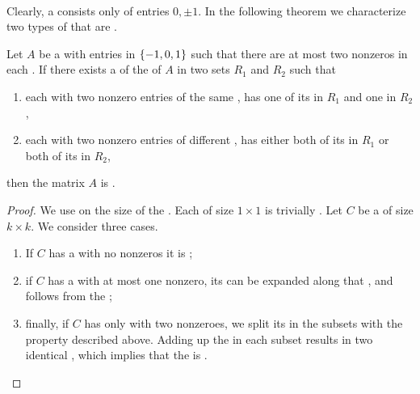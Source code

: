 \paragraph{}
Clearly, a  consists only of entries $0,\pm 1$. In the following theorem we characterize two types of  that are .
\begin{theorem}
Let $A$ be a  with entries in $\left\{ -1, 0, 1 \right\}$ such that there are at most two nonzeros in each . If there exists a  of the  of $A$ in two sets $R_1$ and $R_2$ such that
\begin{enumerate}
 \item each  with two nonzero entries of the same , has one of its  in $R_1$ and one in $R_2$,
 \item each  with two nonzero entries of different , has either both of its  in $R_1$ or both of its  in $R_2$,
\end{enumerate}
then the matrix $A$ is .
\begin{proof}
We use  on the size of the . Each  of size $1\times 1$ is trivially . Let $C$ be a  of size $k\times k$. We consider three cases.
\begin{enumerate}
 \item If $C$ has a  with no nonzeros it is ;
 \item if $C$ has a  with at most one nonzero, its  can be expanded along that , and  follows from the ;
 \item finally, if $C$ has only  with two nonzeroes, we split its  in the subsets with the property described above. Adding up the  in each subset results in two identical  , which implies that the  is .
\end{enumerate}
\end{proof}
\end{theorem}

